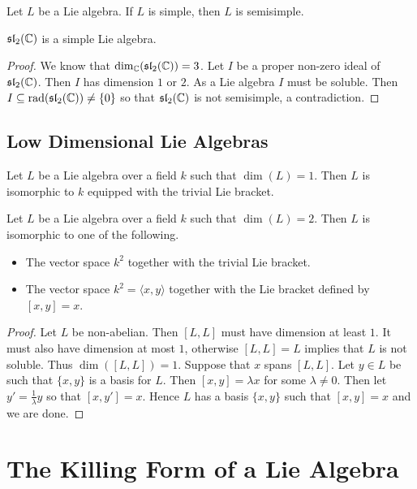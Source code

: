 \documentclass[a4paper]{article}
\begin{document}
\begin{lmm}{}{} Let $L$ be a Lie algebra. If $L$ is simple, then $L$ is semisimple. 
\end{lmm}

\begin{eg}{}{} $\mathfrak{sl}_2(\mathbb{C})$ is a simple Lie algebra. \tcbline
\begin{proof}
We know that $\dim_{\mathbb{C}}(\mathfrak{sl}_2(\mathbb{C}))=3$. Let $I$ be a proper non-zero ideal of $\mathfrak{sl}_2(\mathbb{C})$. Then $I$ has dimension $1$ or $2$. As a Lie algebra $I$ must be soluble. Then $I\subseteq\text{rad}(\mathfrak{sl}_2(\mathbb{C}))\neq\{0\}$ so that $\mathfrak{sl}_2(\mathbb{C})$ is not semisimple, a contradiction. 
\end{proof}
\end{eg}

\subsection{Low Dimensional Lie Algebras}
\begin{prp}{}{} Let $L$ be a Lie algebra over a field $k$ such that $\dim(L)=1$. Then $L$ is isomorphic to $k$ equipped with the trivial Lie bracket. 
\end{prp}

\begin{prp}{}{} Let $L$ be a Lie algebra over a field $k$ such that $\dim(L)=2$. Then $L$ is isomorphic to one of the following. 
\begin{itemize}
\item The vector space $k^2$ together with the trivial Lie bracket. 
\item The vector space $k^2=\langle x,y\rangle$ together with the Lie bracket defined by $[x,y]=x$. 
\end{itemize} \tcbline
\begin{proof}
Let $L$ be non-abelian. Then $[L,L]$ must have dimension at least $1$. It must also have dimension at most $1$, otherwise $[L,L]=L$ implies that $L$ is not soluble. Thus $\dim([L,L])=1$. Suppose that $x$ spans $[L,L]$. Let $y\in L$ be such that $\{x,y\}$ is a basis for $L$. Then $[x,y]=\lambda x$ for some $\lambda\neq 0$. Then let $y'=\frac{1}{\lambda}y$ so that $[x,y']=x$. Hence $L$ has a basis $\{x,y\}$ such that $[x,y]=x$ and we are done. 
\end{proof}
\end{prp}

\pagebreak
\section{The Killing Form of a Lie Algebra}
\end{document}
